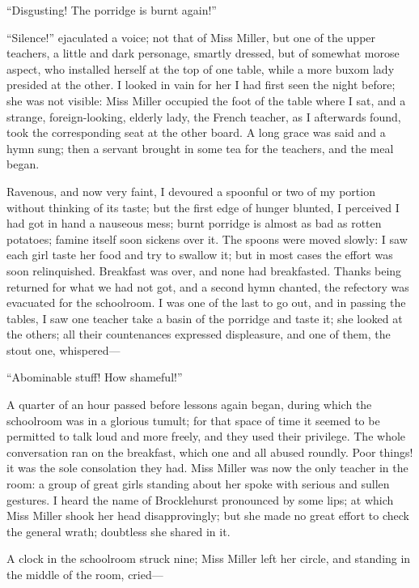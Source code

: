 \enquote{Disgusting! The porridge is burnt again!}

\enquote{Silence!} ejaculated a voice; not that of Miss Miller, but one
of the upper teachers, a little and dark personage, smartly dressed, but
of somewhat morose aspect, who installed herself at the top of one
table, while a more buxom lady presided at the other. I looked in vain
for her I had first seen the night before; she was not visible: Miss
Miller occupied the foot of the table where I sat, and a strange,
foreign-looking, elderly lady, the French teacher, as I afterwards
found, took the corresponding seat at the other board. A long grace was
said and a hymn sung; then a servant brought in some tea for the
teachers, and the meal began.

Ravenous, and now very faint, I devoured a spoonful or two of my portion
without thinking of its taste; but the first edge of hunger blunted, I
perceived I had got in hand a nauseous mess; burnt porridge is almost as
bad as rotten potatoes; famine itself soon sickens over it. The spoons
were moved slowly: I saw each girl taste her food and try to swallow it;
but in most cases the effort was soon relinquished. Breakfast was over,
and none had breakfasted. Thanks being returned for what we had not
got, and a second hymn chanted, the refectory was evacuated for the
schoolroom. I was one of the last to go out, and in passing the tables,
I saw one teacher take a basin of the porridge and taste it; she looked
at the others; all their countenances expressed displeasure, and one of
them, the stout one, whispered---

\enquote{Abominable stuff! How shameful!}

A quarter of an hour passed before lessons again began, during which the
schoolroom was in a glorious tumult; for that space of time it seemed to
be permitted to talk loud and more freely, and they used their
privilege. The whole conversation ran on the breakfast, which one and
all abused roundly. Poor things! it was the sole consolation they had.
Miss Miller was now the only teacher in the room: a group of great girls
standing about her spoke with serious and sullen gestures. I heard the
name of \Mr{} Brocklehurst pronounced by some lips; at which Miss Miller
shook her head disapprovingly; but she made no great effort to check the
general wrath; doubtless she shared in it.

A clock in the schoolroom struck nine; Miss Miller left her circle, and
standing in the middle of the room, cried---

